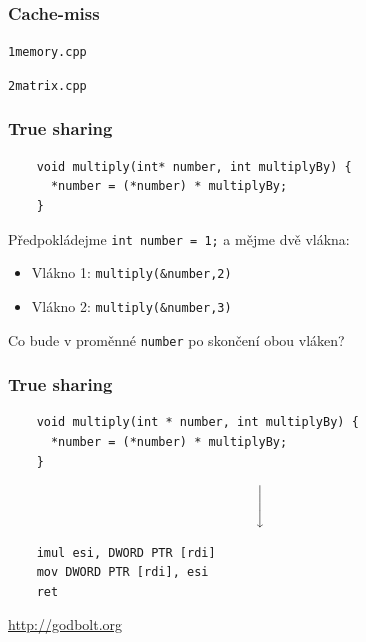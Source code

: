 \documentclass[usenames,dvipsnames,9pt]{beamer}
\newcommand{\see}[1]{\faEye\hspace{5pt}#1}
\begin{document}
\begin{frame}
  \frametitle{Cache-miss}

  \see{\tt{1memory.cpp}}

  \vspace{2em}

  \see{\tt{2matrix.cpp}}
\end{frame}

\begin{frame}[fragile]
  \frametitle{True sharing}
  \begin{verbatim}
    void multiply(int* number, int multiplyBy) {
      *number = (*number) * multiplyBy;
    }
  \end{verbatim}
  \vspace{1.5em}
  Předpokládejme \texttt{int number = 1;} a mějme dvě vlákna:
  \begin{itemize}
    \item Vlákno 1: \texttt{multiply(&number,2)}
    \item Vlákno 2: \texttt{multiply(&number,3)}
  \end{itemize}
  Co bude v proměnné \texttt{number} po skončení obou vláken?
\end{frame}
\begin{frame}[fragile]
  \frametitle{True sharing}
  \begin{verbatim}
    void multiply(int * number, int multiplyBy) {
      *number = (*number) * multiplyBy;
    }
  \end{verbatim}
  \vspace{1em}\[ \Bigg\downarrow \]\vspace{1em}
  \begin{verbatim}
    imul esi, DWORD PTR [rdi]
    mov DWORD PTR [rdi], esi
    ret
  \end{verbatim}

  \pause

  \vspace{1.5em}
  {\hfill\see{\url{http://godbolt.org}}}
\end{frame}
\end{document}
